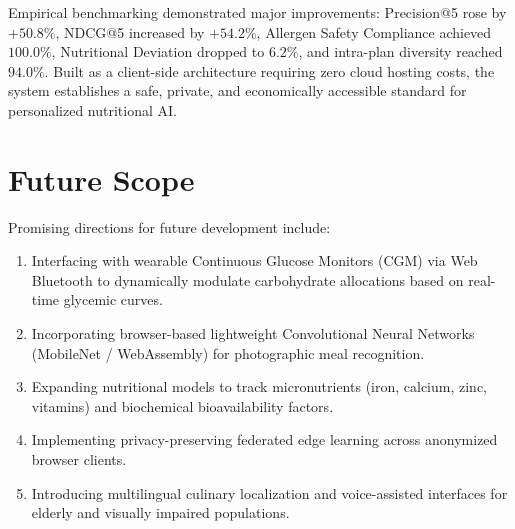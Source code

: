 \documentclass[12pt,a4paper]{report}
\begin{document}
Empirical benchmarking demonstrated major improvements: Precision@5 rose by $+50.8\%$, NDCG@5 increased by $+54.2\%$, Allergen Safety Compliance achieved $100.0\%$, Nutritional Deviation dropped to $6.2\%$, and intra-plan diversity reached $94.0\%$. Built as a client-side architecture requiring zero cloud hosting costs, the system establishes a safe, private, and economically accessible standard for personalized nutritional AI.

\section{Future Scope}
Promising directions for future development include:
\begin{enumerate}
    \item Interfacing with wearable Continuous Glucose Monitors (CGM) via Web Bluetooth to dynamically modulate carbohydrate allocations based on real-time glycemic curves.
    \item Incorporating browser-based lightweight Convolutional Neural Networks (MobileNet / WebAssembly) for photographic meal recognition.
    \item Expanding nutritional models to track micronutrients (iron, calcium, zinc, vitamins) and biochemical bioavailability factors.
    \item Implementing privacy-preserving federated edge learning across anonymized browser clients.
    \item Introducing multilingual culinary localization and voice-assisted interfaces for elderly and visually impaired populations.
\end{enumerate}
\end{document}
